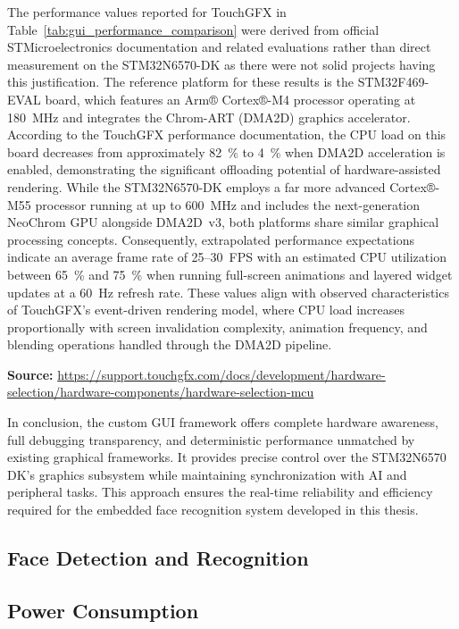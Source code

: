 The performance values reported for TouchGFX in Table~\ref{tab:gui_performance_comparison} were derived from official STMicroelectronics documentation and related evaluations rather than direct measurement on the STM32N6570-DK as there were not solid projects having this justification. The reference platform for these results is the STM32F469-EVAL board, which features an Arm® Cortex®-M4 processor operating at 180~MHz and integrates the Chrom-ART (DMA2D) graphics accelerator. According to the TouchGFX performance documentation, the CPU load on this board decreases from approximately 82~\% to 4~\% when DMA2D acceleration is enabled, demonstrating the significant offloading potential of hardware-assisted rendering. While the STM32N6570-DK employs a far more advanced Cortex®-M55 processor running at up to 600~MHz and includes the next-generation NeoChrom GPU alongside DMA2D~v3, both platforms share similar graphical processing concepts. Consequently, extrapolated performance expectations indicate an average frame rate of 25–30~FPS with an estimated CPU utilization between 65~\% and 75~\% when running full-screen animations and layered widget updates at a 60~Hz refresh rate. These values align with observed characteristics of TouchGFX’s event-driven rendering model, where CPU load increases proportionally with screen invalidation complexity, animation frequency, and blending operations handled through the DMA2D pipeline.

\textbf{Source:} \url{https://support.touchgfx.com/docs/development/hardware-selection/hardware-components/hardware-selection-mcu}



\vspace{1em}
In conclusion, the custom GUI framework offers complete hardware awareness, full debugging transparency, and deterministic performance unmatched by existing graphical frameworks. It provides precise control over the STM32N6570 DK’s graphics subsystem while maintaining synchronization with AI and peripheral tasks. This approach ensures the real-time reliability and efficiency required for the embedded face recognition system developed in this thesis.






\subsection{Face Detection and Recognition}
\subsection{Power Consumption}
